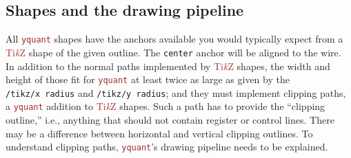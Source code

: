 \documentclass{scrartcl}
\def\TikZ{\textcolor{brown}{Ti\textit kZ}}
\def\pkg#1{\textcolor{brown}{\texttt{#1}}}
\def\Yquant{\pkg{yquant}}
\begin{document}
      \subsection{Shapes and the drawing pipeline}\label{sec:pipeline}
         \linkdef\protect
         All \Yquant{} shapes have the anchors available you would typically expect from a \TikZ{} shape of the given outline.
         The \texttt{center} anchor will be aligned to the wire.
         In addition to the normal paths implemented by \TikZ{} shapes, the width and height of those fit for \Yquant{} at least twice as large as given by the \texttt{/tikz/x~radius} and \texttt{/tikz/y~radius}; and they must implement clipping paths, a \Yquant{} addition to \TikZ{} shapes.
         Such a path has to provide the ``clipping outline,'' i.e., anything that should not contain register or control lines.
         There may be a difference between horizontal and vertical clipping outlines.
         To understand clipping paths, \Yquant's drawing pipeline needs to be explained.
\end{document}
